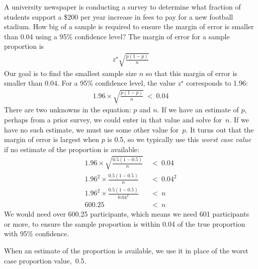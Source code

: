 \begin{examplewrap}
\begin{nexample}{A university newspaper is conducting
    a survey to determine what fraction of students
    support a \$200 per year increase in fees to pay
    for a new football stadium.
    How big of a sample is required to ensure the
    margin of error is smaller than 0.04 using a
    95\% confidence level?}
  The margin of error for a sample proportion is
  \begin{align*}
  z^{\star} \sqrt{\frac{p (1 - p)}{n}}
  \end{align*}
  Our goal is to find the smallest sample size $n$
  so that this margin of error is smaller than $0.04$.
  For a 95\% confidence level, the value $z^{\star}$
  corresponds to 1.96:
  \begin{align*}
  1.96\times \sqrt{\frac{p(1-p)}{n}} \ < \ 0.04
  \end{align*}
  There are two unknowns in the equation: $p$ and $n$.
  If we have an estimate of $p$, perhaps from a prior
  survey, we could enter in that value and solve for~$n$.
  If we have no such estimate, we must use some other
  value for~$p$.
  It turns out that the margin of error is largest
  when $p$ is 0.5, so we typically use this
  \emph{worst case value} if no estimate of the
  proportion is available:
  \begin{align*}
	1.96\times \sqrt{\frac{0.5(1-0.5)}{n}} &\ < \ 0.04 \\
	1.96^2\times \frac{0.5(1-0.5)}{n} &\ < \ 0.04^2 \\
	1.96^2\times \frac{0.5(1-0.5)}{0.04^2} &\ < \ n \\
	600.25 &\ < \  n
  \end{align*}
  We would need over 600.25 participants, which means
  we need 601 participants or more, to ensure the
  sample proportion is within 0.04 of the true proportion
  with 95\% confidence.
\end{nexample}
\end{examplewrap}


When an estimate of the proportion is available, we use it in place of the worst case proportion value,~0.5.

\D{\newpage}



